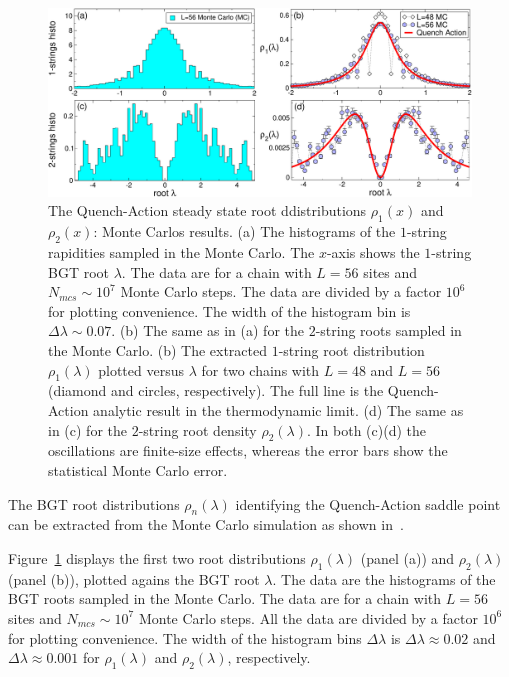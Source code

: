 \documentclass[11pt]{iopart}
\begin{document}
\begin{figure}[t]
\begin{center}
\includegraphics[width=.95\textwidth]{./draft_figs/Neel_rho}
\end{center}
\caption{ The Quench-Action steady state root ddistributions $\rho_1(x)$ 
 and $\rho_2(x)$: Monte Carlos results. (a) The histograms of the $1$-string 
 rapidities sampled in the Monte Carlo. The $x$-axis shows the $1$-string BGT 
 root $\lambda$. The data are for a chain with $L=56$ sites and $N_{mcs}\sim 
 10^7$ Monte Carlo steps. The data are divided by a factor $10^6$ for plotting 
 convenience. The width of the histogram bin is $\Delta\lambda\sim 0.07$. (b) 
 The same as in (a) for the $2$-string roots sampled in the Monte Carlo. (b) 
 The extracted $1$-string root distribution $\rho_1(\lambda)$ plotted versus 
 $\lambda$ for two chains with $L=48$ and $L=56$ (diamond and circles, respectively). 
 The full line is the Quench-Action analytic result in the thermodynamic limit. (d) 
 The same as in (c) for the $2$-string root density $\rho_2(\lambda)$. In both 
 (c)(d) the oscillations are finite-size effects, whereas the error bars 
 show the statistical Monte Carlo error. 
}
\label{fig6-neel-roots}
\end{figure}

The BGT root distributions $\rho_n(\lambda)$ identifying the Quench-Action saddle 
point can be extracted from the Monte Carlo simulation as shown in~\cite{alba-2015}. 

Figure~\ref{fig6-neel-roots} displays the first two root distributions 
$\rho_1(\lambda)$ (panel (a)) and $\rho_2(\lambda)$ (panel (b)), plotted agains 
the BGT root $\lambda$. The data are the histograms of the BGT roots sampled 
in the Monte Carlo. The data are for a chain with $L=56$ sites and 
$N_{mcs}\sim 10^7$ Monte Carlo steps. All the data are divided by a factor 
$10^6$ for plotting convenience. The width of the histogram bins $\Delta\lambda$ 
is $\Delta\lambda\approx0.02$ and $\Delta\lambda\approx0.001$ for $\rho_1(\lambda)$ 
and $\rho_2(\lambda)$, respectively. 
\end{document}
